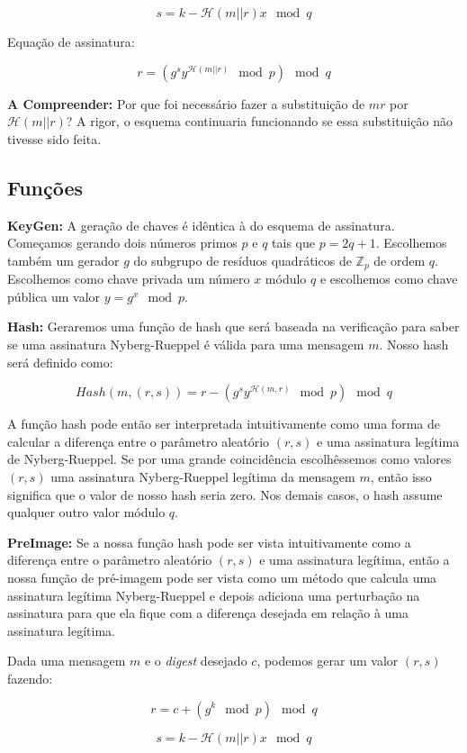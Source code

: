 \documentclass[a4paper]{article}
\begin{document}
 $$
 s = k-\mathcal{H}(m||r)x \mod q
 $$
 
 Equação de assinatura:
 
 $$
 r = (g^sy^{\mathcal{H}(m||r)} \mod p) \mod q
 $$
 
 \textbf{A Compreender: }Por que foi necessário fazer a substituição de
 $mr$ por $\mathcal{H}(m||r)$? A rigor, o esquema continuaria
 funcionando se essa substituição não tivesse sido feita.
 
 \subsection{Funções}
 
 \textbf{KeyGen: }A geração de chaves é idêntica à do esquema de
 assinatura. Começamos gerando dois números primos $p$ e $q$ tais que
 $p=2q+1$. Escolhemos também um gerador $g$ do subgrupo de resíduos
 quadráticos de $\mathbb{Z}_p$ de ordem $q$. Escolhemos como chave
 privada um número $x$ módulo $q$ e escolhemos como chave pública um
 valor $y=g^x \mod p$.
 
 \textbf{Hash: } Geraremos uma função de hash que será baseada na
 verificação para saber se uma assinatura Nyberg-Rueppel é válida para
 uma mensagem $m$. Nosso hash será definido como:
 
 $$
 Hash(m, (r, s)) = r - (g^sy^{\mathcal{H}(m, r)} \mod p) \mod q
 $$
 
 A função hash pode então ser interpretada intuitivamente como uma
 forma de calcular a diferença entre o parâmetro aleatório $(r, s)$ e
 uma assinatura legítima de Nyberg-Rueppel. Se por uma grande
 coincidência escolhêssemos como valores $(r, s)$ uma assinatura
 Nyberg-Rueppel legítima da mensagem $m$, então isso significa que o
 valor de nosso hash seria zero. Nos demais casos, o hash assume
 qualquer outro valor módulo $q$.
 
 
 \textbf{PreImage:} Se a nossa função hash pode ser vista
 intuitivamente como a diferença entre o parâmetro aleatório $(r, s)$ e
 uma assinatura legítima, então a nossa função de pré-imagem pode ser
 vista como um método que calcula uma assinatura legítima
 Nyberg-Rueppel e depois adiciona uma perturbação na assinatura para
 que ela fique com a diferença desejada em relação à uma assinatura legítima.
 
 Dada uma mensagem $m$ e o \textit{digest} desejado $c$, podemos gerar
 um valor $(r, s)$ fazendo:
 
 $$
 r = c + (g^k \mod p) \mod q
 $$
 
 $$
 s = k-\mathcal{H}(m||r)x \mod q
 $$
 
\end{document}
